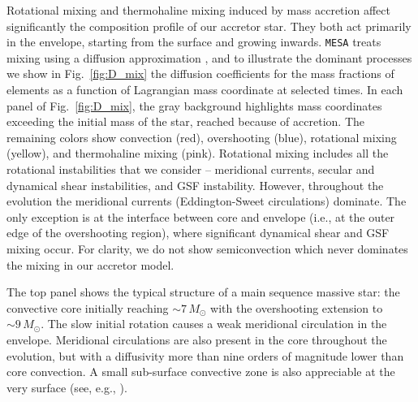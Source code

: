 \documentclass[twocolumn,twocolappendix,trackchanges]{aastex63}
\DeclareRobustCommand{\Figref}[1]{Fig.~\ref{#1}}
\newcommand{\zoph}{$\zeta$ Oph}
\begin{document}
Rotational mixing and thermohaline mixing induced by mass accretion
affect significantly the composition profile of our accretor star. They both
act primarily in the envelope, starting from the
surface and growing inwards. \texttt{MESA} treats mixing using a
diffusion approximation \citep{paxton:11}, and to illustrate the
dominant processes we show in
\Figref{fig:D_mix} the diffusion coefficients for the mass
fractions of elements as a function of Lagrangian mass coordinate at
selected times. %
In each panel of \Figref{fig:D_mix}, the gray background highlights
mass coordinates exceeding the initial mass of the star, reached
because of accretion.  The remaining colors show convection (red),
overshooting (blue), rotational mixing (yellow), and thermohaline
mixing (pink). Rotational mixing includes all the rotational
instabilities that we consider -- meridional currents, secular and
dynamical shear instabilities, and GSF instability. However,
throughout the evolution the meridional currents (Eddington-Sweet
circulations) dominate.  The only exception is at the interface
between core and envelope (i.e., at the outer edge of the overshooting
region), where significant dynamical shear and
GSF mixing occur. For clarity, we do not show
semiconvection which never dominates the mixing in our accretor model.

The top panel shows the typical structure of a main sequence massive
star: the convective core initially reaching $\sim{}7\,M_\odot$ with
the overshooting extension to $\sim{}9\,M_\odot$. The slow initial
rotation causes a weak meridional circulation in the envelope. Meridional
circulations are also present in the core throughout the evolution,
but with a diffusivity more than nine orders of magnitude lower than
core convection. A small sub-surface convective zone is also
appreciable at the very surface (see, e.g., \citealt{cantiello:21}).
\end{document}

